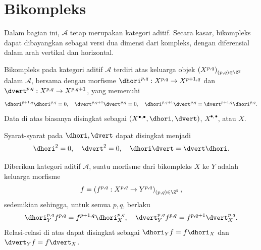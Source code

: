 
\section{Bikompleks}\label{sec:double-cplx}
\hypertarget{o014.aljabr2.chapter3.double-complexes}{ }

Dalam bagian ini, $\mathcal{A}$ tetap merupakan kategori aditif. Secara kasar,
bikompleks dapat dibayangkan sebagai versi dua dimensi dari kompleks, dengan
diferensial dalam arah vertikal dan horizontal.

\begin{definisi}[Bikompleks]\label{def:double-cplx}
	Bikompleks pada kategori aditif $\mathcal{A}$ terdiri atas keluarga objek
	$\left(X^{p,q}\right)_{(p,q)\in\Z^2}$ dalam $\mathcal{A}$, bersama dengan
	morfisme $\dhori^{p,q}:X^{p,q}\to X^{p+1,q}$ dan
	$\dvert^{p,q}:X^{p,q}\to X^{p,q+1}$, yang memenuhi
	\[ \dhori^{p+1,q} \dhori^{p,q} = 0, \quad \dvert^{p, q+1} \dvert^{p,q} = 0, \quad \dhori^{p, q+1} \dvert^{p,q} = \dvert^{p+1, q} \dhori^{p,q}. \]
	Data di atas biasanya disingkat sebagai
	$(X^{\bullet,\bullet},\dhori,\dvert)$, $X^{\bullet,\bullet}$, atau $X$.
\end{definisi}

Syarat-syarat pada $\dhori,\dvert$ dapat disingkat menjadi
\[ \dhori^2 = 0, \quad \dvert^2 = 0, \quad \dhori \dvert = \dvert \dhori. \]

\begin{definisi}\label{def:bicplx}
	Diberikan kategori aditif $\mathcal{A}$, suatu morfisme dari bikompleks $X$
	ke $Y$ adalah keluarga morfisme
	\[ f = \left( f^{p,q}: X^{p, q} \to Y^{p, q} \right)_{(p, q) \in \Z^2}, \]
	sedemikian sehingga, untuk semua $p,q$, berlaku
	\[ \dhori_Y^{p, q} f^{p, q} = f^{p+1, q} \dhori_X^{p, q}, \quad \dvert_Y^{p, q} f^{p, q} = f^{p, q+1} \dvert_X^{p, q}. \]
	Relasi-relasi di atas dapat disingkat sebagai
	$\dhori_Yf=f\dhori_X$ dan $\dvert_Yf=f\dvert_X$.
\end{definisi}


